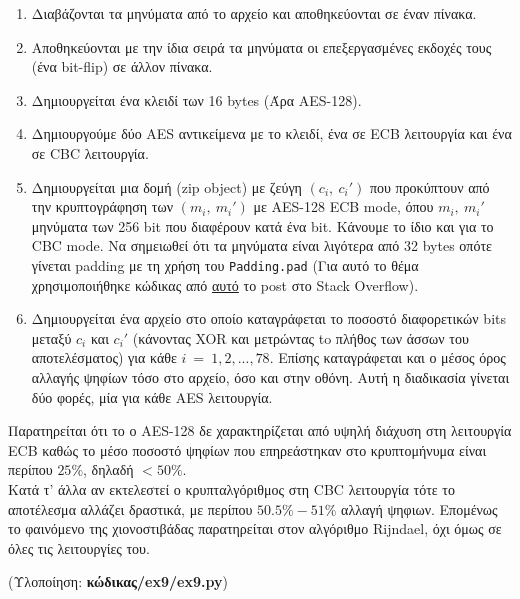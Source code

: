 \documentclass[12pt]{article}
\newcommand{\lt}{\latintext}
\begin{document}
\begin{enumerate}
\item Διαβάζονται τα μηνύματα από το αρχείο και αποθηκεύονται 
σε έναν πίνακα.
\item Αποθηκεύονται με την ίδια σειρά τα μηνύματα οι 
επεξεργασμένες εκδοχές τους (ένα {\lt bit-flip}) σε άλλον 
πίνακα. 
\item Δημιουργείται ένα κλειδί των 16 {\lt bytes} (Άρα 
{\lt AES-128}).
\item Δημιουργούμε δύο {\lt AES} αντικείμενα με το 
κλειδί, ένα σε {\lt ECB} λειτουργία και ένα σε {\lt CBC} 
λειτουργία.
\item Δημιουργείται μια δομή ({\lt zip object}) με ζεύγη 
$(c_i,\:c_i')$ που προκύπτουν από την κρυπτογράφηση των 
$(m_i,\:m_i')$ με {\lt AES-128 ECB mode}, 
όπου $m_i,\:m_i'$ μηνύματα των 256 {\lt bit} 
που διαφέρουν κατά ένα {\lt bit}. Κάνουμε το ίδιο και 
για το {\lt CBC mode}. Να σημειωθεί ότι τα μηνύματα είναι 
λιγότερα από 32 {\lt bytes} οπότε γίνεται {\lt padding} 
με τη χρήση του {\lt \texttt{Padding.pad}} 
(Για αυτό το θέμα χρησιμοποιήθηκε κώδικας από 
\href{https://stackoverflow.com/questions/52181245/valueerror-data-must-be-aligned-to-block-boundary-in-ecb-mode}{\color{blue}αυτό} το 
{\lt post} στο {\lt Stack Overflow}).
\item Δημιουργείται ένα αρχείο στο οποίο καταγράφεται το 
ποσοστό διαφορετικών {\lt bits} μεταξύ $c_i$ και $c_i'$ 
(κάνοντας {\lt XOR} και μετρώντας to πλήθος των άσσων του 
αποτελέσματος) για κάθε $i\:=\:1, 2, ..., 78$. Επίσης 
καταγράφεται και ο μέσος όρος αλλαγής ψηφίων τόσο στο 
αρχείο, όσο και στην οθόνη. Αυτή η διαδικασία γίνεται δύο 
φορές, μία για κάθε {\lt AES} λειτουργία.
\end{enumerate}
Παρατηρείται ότι το ο {\lt AES-128} δε χαρακτηρίζεται από 
υψηλή διάχυση στη λειτουργία {\lt ECB} καθώς 
το μέσο ποσοστό ψηφίων που επηρεάστηκαν στο κρυπτομήνυμα 
είναι περίπου $25\%$, δηλαδή $<50\%$. \\
\indent
Κατά τ' άλλα αν εκτελεστεί ο κρυπταλγόριθμος στη {\lt CBC} 
λειτουργία τότε το αποτέλεσμα αλλάζει δραστικά, με περίπου 
$50.5\%-51\%$ αλλαγή ψηφιων. Επομένως το φαινόμενο της 
χιονοστιβάδας παρατηρείται στον αλγόριθμο {\lt Rijndael}, 
όχι όμως σε όλες τις λειτουργίες του. \\

\vspace{0.1in}

\noindent
(Υλοποίηση: \textbf{κώδικας/{\lt ex9/ex9.py}})

\pagebreak
\end{document}
